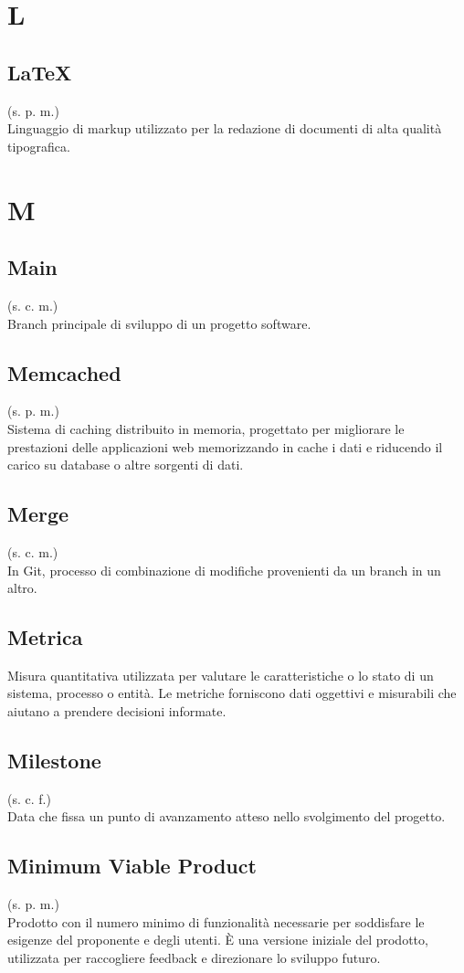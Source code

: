 \section{L}
\subsection{LaTeX}
\label{LaTeX}
(s. p. m.)\\
Linguaggio di markup utilizzato per la redazione di documenti di alta qualità tipografica.
\pagebreak
\section{M}
\subsection{Main}
(s. c. m.)\\
Branch principale di sviluppo di un progetto software.
\subsection{Memcached}
(s. p. m.)\\
Sistema di caching distribuito in memoria, progettato per migliorare le prestazioni
delle applicazioni web memorizzando in cache i dati e riducendo il carico su database
o altre sorgenti di dati.
\subsection{Merge}
(s. c. m.)\\
In Git, processo di combinazione di modifiche provenienti da un branch in un altro.
\subsection{Metrica}
Misura quantitativa utilizzata per valutare le caratteristiche o lo stato di un
sistema, processo o entità. Le metriche forniscono dati oggettivi e misurabili
che aiutano a prendere decisioni informate.
\subsection{Milestone}
(s. c. f.)\\
Data che fissa un punto di avanzamento atteso nello svolgimento del progetto.
\subsection{Minimum Viable Product}
\label{Minimum Viable Product}
(s. p. m.)\\
Prodotto con il numero minimo di funzionalità necessarie per soddisfare
le esigenze del proponente e degli utenti. È una versione iniziale
del prodotto, utilizzata per raccogliere feedback e direzionare lo sviluppo
futuro.

